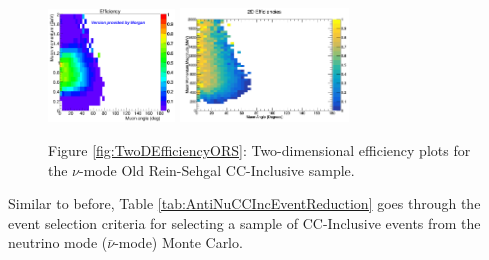 \documentclass[11pt]{article}
\begin{document}
\begin{figure}[H]
\centering
\includegraphics[width=0.3\textwidth]{CCInclusivePlots/MorgansCCInclusiveSample.png}
\includegraphics[width=0.4\textwidth]{CCInclusivePlots/2DEffCompareNMORS.png}
\caption*{Figure \ref*{fig:TwoDEfficiencyORS}: Two-dimensional efficiency plots for the $\nu$-mode Old Rein-Sehgal CC-Inclusive sample.}
\end{figure}\label{fig:TwoDEfficiencyORS}

Similar to before, Table \ref*{tab:AntiNuCCIncEventReduction} goes through the event selection criteria for selecting a sample of CC-Inclusive events from the neutrino mode ($\bar{\nu}$-mode) Monte Carlo.
\end{document}
